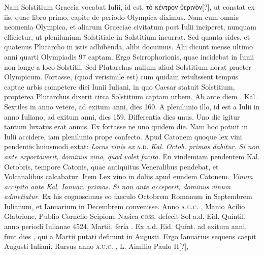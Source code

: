 Nam Solstitium Graecia vocabat  Iulii, id est, 
 \textgreek{τὸ κέντρον θερινὸν[?]},
ut constat ex iis, quae libro primo, capite de periodo Olympica diximus.
Nam cum omnis neomenia Olympica, et aliarum Graeciae
civitatum post  Iulii inciperet, nunquam efficietur, ut plenilunium
Solstitiale in Solstitium incurrat.
Sed quanta sides, et quatenus
Plutarcho in istis adhibenda, alibi docuimus.
Alii dicunt mense
ultimo anni quarti Olympiadis 97 captam.
Ergo  Scirrophorionis,
quae incidebat in  Iunii non longe a loco Solstitii.
Sed
Plutarchus nullum aliud Solstitium norat praeter Olympicum.
Fortasse, (quod verisimile est) cum quidam retulissent tempus captae
urbis competere diei  Iunii Iuliani, in quo Caesar statuit Solstitium,
propterea Plutarchus dixerit circa Solstitium captam urbem.
Ab ante diem . Kal. Sextiles in anno vetere,
 ad exitum anni, dies
160.
%
A plenilunio illo, id est a  Iulii
 in anno Iuliano, ad exitum
anni, dies 159.
Differentia dies unus.
Uno die igitur tantum
luxatus erat annus.
Ex fortasse ne uno quidem die.
Nam hoc potuit
in  Iulii accidere, iam plenilunio prope confecto.
Apud Catonem
quoque lex vini pendentis huiusmodi extat: \textit{Locus vinis ex}
\textsc{a.d.} \textit{Kal. Octob. primas dabitur.} %
\textit{Si non ante exportaverit, dominus
vino, quod volet facito.}
En vindemiam pendentem Kal. Octobris,
tempore Catonis, quae antiquitus Veneralibus pendebat, et Volcanalibus
calcabatur.
Item Lex vino in doliis apud eundem Catonem.
\textit{Vinum accipito ante Kal. Ianuar. primas.} %
\textit{Si non ante acceperit, dominus
vinum admetiatur.}
Ex his cognoscimus eo faeculo Octobrem
Romanum in Septembrem Iulianum, et Ianuarium in Decembrem
convenisse.
Anno \textsc{a.u.c.} , Manio Acilio Glabrione,
 Publio Cornelio
Scipione Nasica \textsc{coss.} defecit Sol a.d.  Eid. Quintil. %
 anno periodi
Iulianae 4524,  Martii, feria .
Ex a.d. Eid. Quint. ad
 exitum anni,
funt dies , qui a  Martii putati definunt
 in  Augusti.
Ergo Ianuarius sequens caepit  Augusti Iuliani.
Rursus anno \textsc{a.u.c.} , L. Aimilio Paulo II[?],
